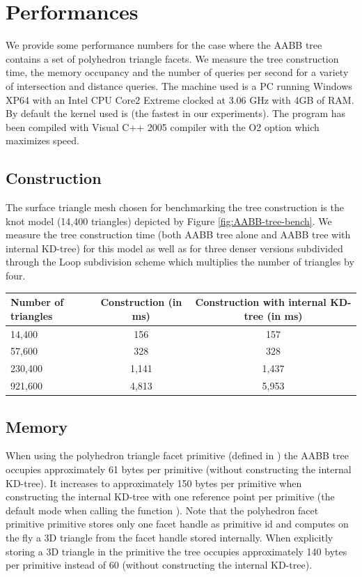 \section{Performances}
\label{AABB_tree_section_performances}

We provide some performance numbers for the case where the AABB tree contains a set of polyhedron triangle facets. We measure the tree construction time, the memory occupancy and the number of queries per second for a variety of intersection and distance queries. The machine used is a PC running Windows XP64 with an Intel CPU Core2 Extreme clocked at 3.06 GHz with 4GB of RAM. By default the kernel used is  (the fastest in our experiments). The program has been compiled with Visual C++ 2005 compiler with the O2 option which maximizes speed.

\subsection{Construction}

The surface triangle mesh chosen for benchmarking the tree construction is the knot model (14,400 triangles) depicted by Figure \ref{fig:AABB-tree-bench}. We measure the tree construction time (both AABB tree alone and AABB tree with internal KD-tree)  for this model as well as for three denser versions subdivided through the Loop subdivision scheme which multiplies the number of triangles by four.

\begin{tabular}{|l|c|c|}
  \hline
  Number of triangles & Construction (in ms) & Construction with internal KD-tree (in ms)\\
  \hline
   14,400 &   156 &   157 \\
   57,600 &   328 &   328 \\
  230,400 & 1,141 & 1,437 \\
  921,600 & 4,813 & 5,953 \\
  \hline
\end{tabular}



\subsection{Memory}

When using the polyhedron triangle facet primitive (defined in ) the AABB tree occupies approximately 61 bytes per primitive (without constructing the internal KD-tree). It increases to approximately 150 bytes per primitive when constructing the internal KD-tree with one reference point per primitive (the default mode when calling the function ). Note that the polyhedron facet primitive primitive stores only one facet handle as primitive id and computes on the fly a 3D triangle from the facet handle stored internally. When explicitly storing a 3D triangle in the primitive the tree occupies approximately 140 bytes per primitive instead of 60 (without constructing the internal KD-tree).\\


